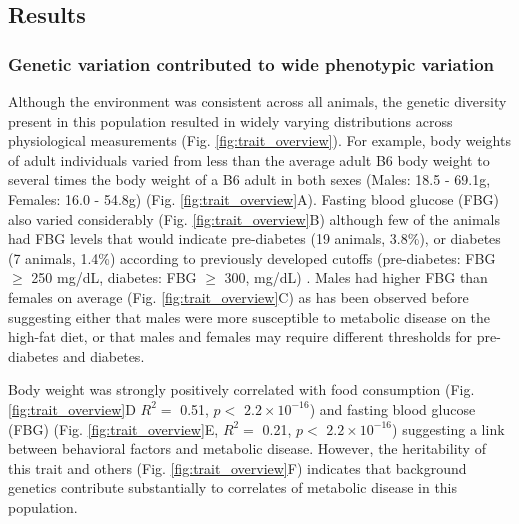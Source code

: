 \documentclass[
]{article}
\begin{document}
\subsection{Results}\label{results}

\subsubsection{Genetic variation contributed to wide phenotypic
variation}\label{genetic-variation-contributed-to-wide-phenotypic-variation}

Although the environment was consistent across all animals, the genetic
diversity present in this population resulted in widely varying
distributions across physiological measurements (Fig.
\ref{fig:trait_overview}). For example, body weights of adult
individuals varied from less than the average adult B6 body weight to
several times the body weight of a B6 adult in both sexes (Males: 18.5 -
69.1g, Females: 16.0 - 54.8g) (Fig. \ref{fig:trait_overview}A). Fasting
blood glucose (FBG) also varied considerably (Fig.
\ref{fig:trait_overview}B) although few of the animals had FBG levels
that would indicate pre-diabetes (19 animals, 3.8\%), or diabetes (7
animals, 1.4\%) according to previously developed cutoffs (pre-diabetes:
FBG \(\geq\) 250 mg/dL, diabetes: FBG \(\geq\) 300, mg/dL)
\cite{pmid17018838}. Males had higher FBG than females on average (Fig.
\ref{fig:trait_overview}C) as has been observed before suggesting either
that males were more susceptible to metabolic disease on the high-fat
diet, or that males and females may require different thresholds for
pre-diabetes and diabetes.

Body weight was strongly positively correlated with food consumption
(Fig. \ref{fig:trait_overview}D \(R^2 =\) 0.51, \(p<\)
\ensuremath{2.2\times 10^{-16}}) and fasting blood glucose (FBG) (Fig.
\ref{fig:trait_overview}E, \(R^2=\) 0.21, \(p <\)
\ensuremath{2.2\times 10^{-16}}) suggesting a link between behavioral
factors and metabolic disease. However, the heritability of this trait
and others (Fig. \ref{fig:trait_overview}F) indicates that background
genetics contribute substantially to correlates of metabolic disease in
this population.
\end{document}
